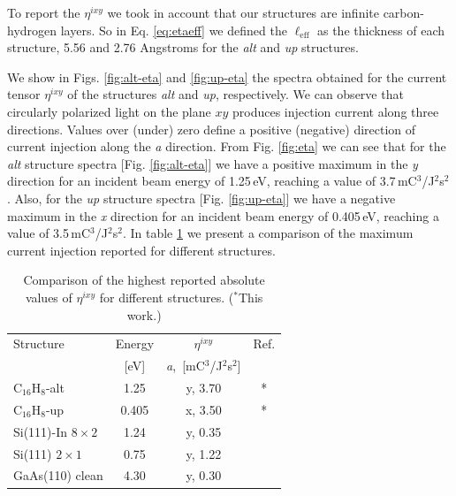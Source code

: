 \documentclass[aps,pra,11pt,tightenlines,showpacs,superscriptaddress,groupedaddress]{revtex4-1}
\newcommand{\ea}{$\eta^{ixy}$}
\newcommand{\altstc}{C$_{16}$H$_{8}$-alt}
\newcommand{\upstc}{C$_{16}$H$_{8}$-up}
\begin{document}
To report the {\ea} we took in account that our structures are infinite carbon-hydrogen layers. So in Eq. \ref{eq:etaeff} we defined the $\ell_{\text{eff}}$ as the thickness of each structure, 5.56 and 2.76 Angstroms for the \emph{alt} and \emph{up} structures.

We show in Figs. \ref{fig:alt-eta} and \ref{fig:up-eta}  the spectra obtained for the current tensor {\ea} of the structures \emph{alt} and \emph{up}, respectively. We can observe that circularly polarized light on the plane $xy$ produces injection current along three directions. Values over (under) zero define a positive (negative) direction of current injection along the \emph{a} direction. From Fig. \ref{fig:eta} we can see that for the \emph{alt} structure spectra [Fig. \ref{fig:alt-eta}] we have a positive maximum in the \emph{y} direction for an incident beam energy of 1.25\,eV, reaching a value of 3.7\,mC$^{3}$/J$^{2}$s$^{2}$ . Also, for the \emph{up} structure spectra [Fig. \ref{fig:up-eta}] we have a negative maximum in the \emph{x} direction for an incident beam energy of 0.405\,eV, reaching a value of 3.5\,mC$^{3}$/J$^{2}$s$^{2}$. In table \ref{tab:etacomp} we present a comparison of the maximum current injection reported for different structures.



\begin{table}[]
    \caption{Comparison of the highest reported absolute values of {\ea} for different structures. ($^{*}$This work.)}
    \label{tab:etacomp}
    \centering
    \begin{ruledtabular}
    \begin{tabular}{lccc}
    Structure & Energy &{\ea} &  Ref.\\
              & [eV]   & \hspace{-2.5mm} \emph{a},\, [mC$^{3}$/J$^{2}$s$^{2}$] \\
    \hline
    {\altstc}               & 1.25  & y, 3.70  & *     \\
    {\upstc}                & 0.405 & x, 3.50  & *     \\
    Si(111)-In $8\times2$   & 1.24  & y, 0.35  & \cite{arzate2014optical}  \\
    Si(111) $2\times1$      & 0.75  & y, 1.22  & \cite{mendoza2012optical} \\
    GaAs(110) clean         & 4.30  & y, 0.30  & \cite{nastos2007full}     \\
    \end{tabular}
    \end{ruledtabular}
\end{table}
\end{document}
